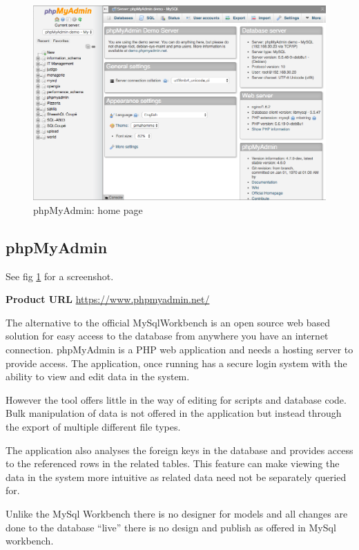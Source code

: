 \begin{figure}
  \includegraphics[width=\linewidth]{Figures/phpmyadmin.png}
  \caption{phpMyAdmin: home page}
  \label{fig:phpmyadmin}
\end{figure}


\subsection{phpMyAdmin}\label{phpmyadmin}

\noindent
See fig \ref{fig:phpmyadmin} for a screenshot.

\noindent
\textbf{Product URL}\cite{phpmyadmin}
\url{https://www.phpmyadmin.net/}


The alternative to the official MySqlWorkbench is an open source web
based solution for easy access to the database from anywhere you have an
internet connection. phpMyAdmin is a PHP web application and needs a
hosting server to provide access. The application, once running
has a secure login system with the ability to view and edit data in the
system.

However the tool offers little in the way of editing for scripts and
database code. Bulk manipulation of data is not offered in the
application but instead through the export of multiple different file
types.

The application also analyses the foreign keys in the database and provides access to the referenced rows in the related tables. This feature can make viewing the data in the system more intuitive as related data need not be separately queried for.

Unlike the MySql Workbench there is no designer for models and all
changes are done to the database ``live'' there is no design and publish
as offered in MySql workbench.


